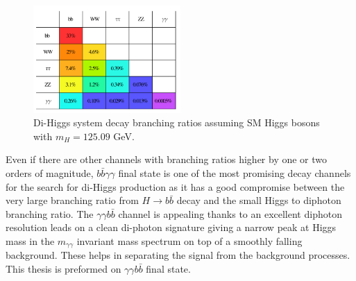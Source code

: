 \begin{figure}[H]
    \centering
    \includegraphics[width=0.5\textwidth]{Ch1/Img/HH_decays.png}
    \caption{Di-Higgs system decay branching ratios assuming SM Higgs bosons with $m_H=125.09$ GeV.}
    \label{fig:chap1:HH:HPD:DCY}
\end{figure}
Even if there are other channels with branching ratios higher by one or two orders of magnitude, $b\bar{b}\gamma\gamma$ final state is one of the most promising decay channels for the search for di-Higgs production as it has a good compromise between the very large branching ratio from $H\rightarrow b\bar{b}$ decay and the small Higgs to diphoton branching ratio. The $\gamma\gamma b\bar{b}$ channel is appealing thanks to an excellent diphoton resolution leads on a clean di-photon signature giving a narrow peak at Higgs mass in the $m_{\gamma\gamma}$ invariant mass spectrum
on top of a smoothly falling background. These helps in separating the signal from the background processes. This thesis is preformed on $\gamma\gamma b\bar{b}$ final state.

